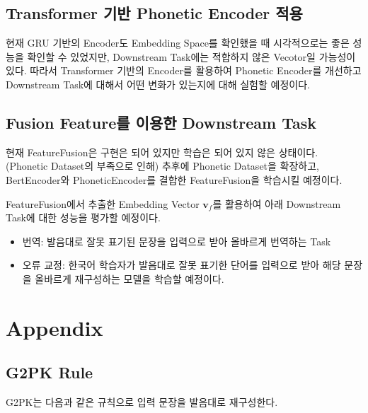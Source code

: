 \documentclass[letterpaper]{article} %
\begin{document}
\subsection{Transformer 기반 Phonetic Encoder 적용}
현재 GRU 기반의 Encoder도 Embedding Space를 확인했을 때 시각적으로는 좋은 성능을 확인할 수 있었지만, Downstream Task에는 적합하지 않은 Vecotor일 가능성이 있다. 
따라서 Transformer 기반의 Encoder를 활용하여 Phonetic Encoder를 개선하고 Downstream Task에 대해서 어떤 변화가 있는지에 대해 실험할 예정이다.

\subsection{Fusion Feature를 이용한 Downstream Task}
현재 FeatureFusion은 구현은 되어 있지만 학습은 되어 있지 않은 상태이다. (Phonetic Dataset의 부족으로 인해) 추후에 Phonetic Dataset을 확장하고, BertEncoder와 PhoneticEncoder를 결합한 FeatureFusion을 학습시킬 예정이다.

FeatureFusion에서 추출한 Embedding Vector $\mathbf{v}_f$를 활용하여 아래 Downstream Task에 대한 성능을 평가할 예정이다.
\begin{itemize}
    \item 번역: 발음대로 잘못 표기된 문장을 입력으로 받아 올바르게 번역하는 Task
    \item 오류 교정: 한국어 학습자가 발음대로 잘못 표기한 단어를 입력으로 받아 해당 문장을 올바르게 재구성하는 모델을 학습할 예정이다.
\end{itemize}


\clearpage
\section{Appendix}
\subsection{G2PK Rule} \label{sec:g2pk_rule}
G2PK는 다음과 같은 규칙으로 입력 문장을 발음대로 재구성한다.
\end{document}

